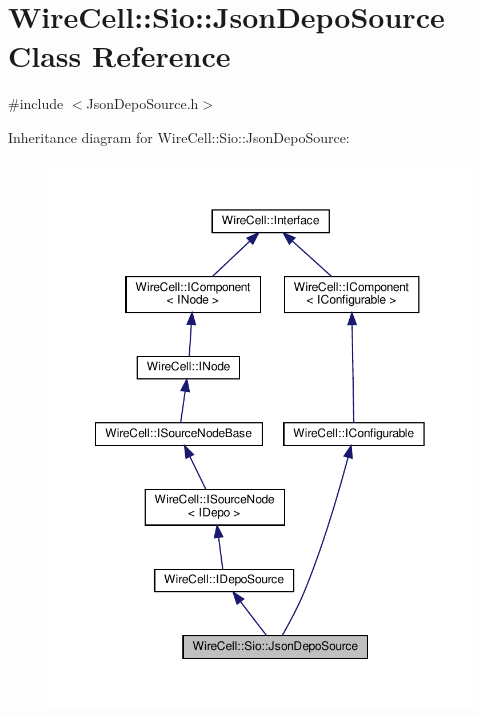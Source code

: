 \hypertarget{class_wire_cell_1_1_sio_1_1_json_depo_source}{}\section{Wire\+Cell\+:\+:Sio\+:\+:Json\+Depo\+Source Class Reference}
\label{class_wire_cell_1_1_sio_1_1_json_depo_source}


{\ttfamily \#include $<$Json\+Depo\+Source.\+h$>$}



Inheritance diagram for Wire\+Cell\+:\+:Sio\+:\+:Json\+Depo\+Source\+:
\nopagebreak
\begin{figure}[H]
\begin{center}
\leavevmode
\includegraphics[width=350pt]{class_wire_cell_1_1_sio_1_1_json_depo_source__inherit__graph}
\end{center}
\end{figure}



